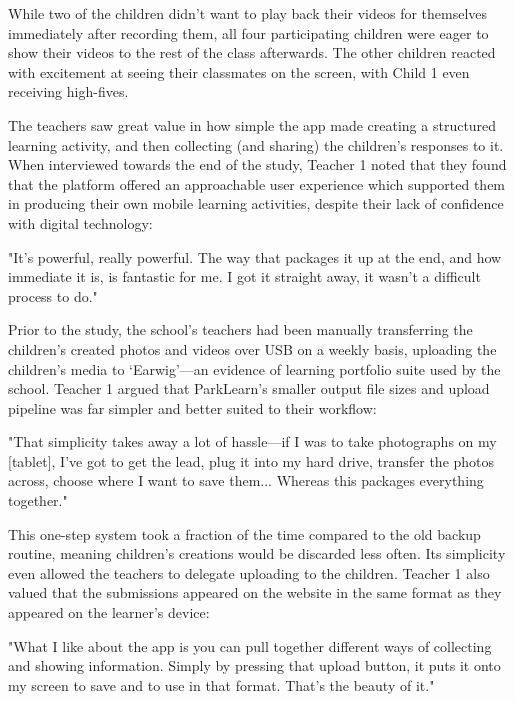 While two of the children didn’t want to play back their videos for themselves immediately after recording them, all four participating children were eager to show their videos to the rest of the class afterwards. The other children reacted with excitement at seeing their classmates on the screen, with Child 1 even receiving high-fives.

The teachers saw great value in how simple the app made creating a structured learning activity, and then  collecting (and sharing) the children’s responses to it. When interviewed towards the end of the study, Teacher 1 noted that they found that the platform offered an approachable user experience which supported them in producing their own mobile learning activities, despite their lack of confidence with digital technology:

\begin{displayquote}
"It’s powerful, really powerful. The way that packages it up at the end, and how immediate it is, is fantastic for me. I got it straight away, it wasn't a difficult process to do."
\end{displayquote}

Prior to the study, the school’s teachers had been manually transferring the children’s created photos and videos over USB on a weekly basis, uploading the children’s media to `Earwig'---an evidence of learning portfolio suite used by the school. Teacher 1 argued that ParkLearn’s smaller output file sizes and upload pipeline was far simpler and better suited to their workflow:

\begin{displayquote}
"That simplicity takes away a lot of hassle---if I was to take photographs on my [tablet], I've got to get the lead, plug it into my hard drive, transfer the photos across, choose where I want to save them... Whereas this packages everything together."
\end{displayquote}

This one-step system took a fraction of the time compared to the old backup routine, meaning children’s creations would be discarded less often. Its simplicity even allowed the teachers to delegate uploading to the children. Teacher 1 also valued that the submissions appeared on the website in the same format as they appeared on the learner’s device: 

\begin{displayquote}
"What I like about the app is you can pull together different ways of collecting and showing information. Simply by pressing that upload button, it puts it onto my screen to save and to use in that format. That’s the beauty of it."
\end{displayquote}

